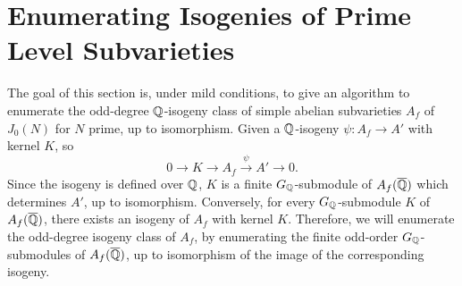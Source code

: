 \documentclass{article}
\begin{document}
    
\section{Enumerating Isogenies of Prime Level Subvarieties}

The goal of this section is, under mild conditions, to give an algorithm to
enumerate the odd-degree $\mathbb{Q}$-isogeny class of simple abelian subvarieties
$A_f$ of $J_0(N)$ for $N$ prime, up to isomorphism. Given a $\mathbb{Q}$-isogeny
$\psi:A_f\to A'$ with kernel $K$, so
\[
    0 \to K \to A_f \overset{\psi}{\to} A' \to 0.
\]
Since the isogeny is defined over $\mathbb{Q}$, $K$ is a finite $G_{\mathbb{Q}}$-submodule of
$A_f(\overline{\mathbb{Q}})$ which determines $A'$, up to isomorphism. Conversely, for every
$G_{\mathbb{Q}}$-submodule $K$ of $A_f(\overline{\mathbb{Q}})$, there exists an isogeny of $A_f$ with
kernel $K$. Therefore, we will enumerate the odd-degree isogeny class of $A_f$,
by enumerating the finite odd-order $G_{\mathbb{Q}}$-submodules of $A_f(\overline{\mathbb{Q}})$, up to
isomorphism of the image of the corresponding isogeny. 
\end{document}
